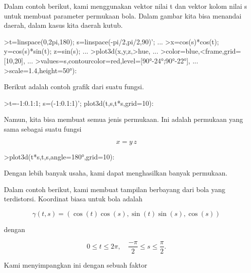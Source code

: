 \documentclass[a4paper,10pt]{article}
\begin{document}
\begin{eulernotebook}
\begin{eulercomment}
\begin{eulercomment}
\begin{eulercomment}
Dalam contoh berikut, kami menggunakan vektor nilai t dan vektor kolom
nilai s untuk membuat parameter permukaan bola. Dalam gambar kita bisa
menandai daerah, dalam kasus kita daerah kutub.
\end{eulercomment}
\begin{eulerprompt}
>t=linspace(0,2pi,180); s=linspace(-pi/2,pi/2,90)'; ...
>x=cos(s)*cos(t); y=cos(s)*sin(t); z=sin(s); ...
>plot3d(x,y,z,>hue, ...
>color=blue,<frame,grid=[10,20], ...
>values=s,contourcolor=red,level=[90°-24°;90°-22°], ...
>scale=1.4,height=50°):
\end{eulerprompt}
\begin{eulercomment}
Berikut adalah contoh grafik dari suatu fungsi.
\end{eulercomment}
\begin{eulerprompt}
>t=-1:0.1:1; s=(-1:0.1:1)'; plot3d(t,s,t*s,grid=10):
\end{eulerprompt}
\begin{eulercomment}
Namun, kita bisa membuat semua jenis permukaan. Ini adalah permukaan
yang sama sebagai suatu fungsi

\end{eulercomment}
\begin{eulerformula}
\[
x = y \, z
\]
\end{eulerformula}
\begin{eulerprompt}
>plot3d(t*s,t,s,angle=180°,grid=10):
\end{eulerprompt}
\begin{eulercomment}
Dengan lebih banyak usaha, kami dapat menghasilkan banyak permukaan.

Dalam contoh berikut, kami membuat tampilan berbayang dari bola yang
terdistorsi. Koordinat biasa untuk bola adalah

\end{eulercomment}
\begin{eulerformula}
\[
\gamma(t,s) = (\cos(t)\cos(s),\sin(t)\sin(s),\cos(s))
\]
\end{eulerformula}
\begin{eulercomment}
dengan

\end{eulercomment}
\begin{eulerformula}
\[
0 \le t \le 2\pi, \quad \frac{-\pi}{2} \le s \le \frac{\pi}{2}.
\]
\end{eulerformula}
\begin{eulercomment}
Kami menyimpangkan ini dengan sebuah faktor


\end{eulercomment}
\end{eulercomment}
\end{eulercomment}
\end{eulernotebook}
\end{document}

